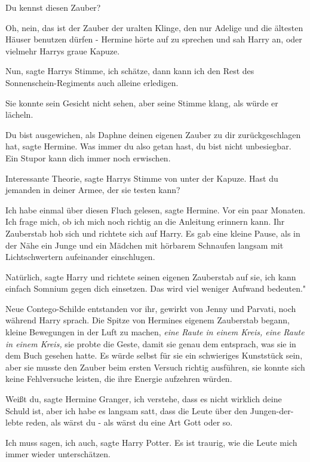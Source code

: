 \glqq{}Du kennst diesen Zauber?\grqq{}

\glqq{}Oh, nein, das ist der Zauber der uralten Klinge, den nur Adelige und die
ältesten Häuser benutzen dürfen -\grqq{} Hermine hörte auf zu sprechen und sah
Harry an, oder vielmehr Harrys graue Kapuze.

\glqq{}Nun\grqq{}, sagte Harrys Stimme, \glqq{}ich schätze, dann kann ich den Rest
des Sonnenschein-Regiments auch alleine erledigen.\grqq{}

Sie konnte sein Gesicht nicht sehen, aber seine Stimme klang, als würde er
lächeln.

\glqq{}Du bist ausgewichen, als Daphne deinen eigenen Zauber zu dir
zurückgeschlagen hat\grqq{}, sagte Hermine. \glqq{}Was immer du also getan hast,
du bist nicht unbesiegbar. Ein Stupor kann dich immer noch erwischen.\grqq{}

\glqq{}Interessante Theorie\grqq{}, sagte Harrys Stimme von unter der Kapuze.
\glqq{}Hast du jemanden in deiner Armee, der sie testen kann?\grqq{}

\glqq{}Ich habe einmal über diesen Fluch gelesen\grqq{}, sagte Hermine. \glqq{}Vor
ein paar Monaten. Ich frage mich, ob ich mich noch richtig an die Anleitung
erinnern kann.\grqq{} Ihr Zauberstab hob sich und richtete sich auf Harry. Es
gab eine kleine Pause, als in der Nähe ein Junge und ein Mädchen mit hörbarem
Schnaufen langsam mit Lichtschwertern aufeinander einschlugen.

\glqq{}Natürlich\grqq{}, sagte Harry und richtete seinen eigenen Zauberstab auf
sie, \glqq{}ich kann einfach Somnium gegen dich einsetzen. Das wird viel weniger
Aufwand bedeuten."

Neue Contego-Schilde entstanden vor ihr, gewirkt von Jenny und Parvati, noch
während Harry sprach. Die Spitze von Hermines eigenem Zauberstab begann, kleine
Bewegungen in der Luft zu machen, \emph{eine Raute in einem Kreis, eine Raute in
einem Kreis,} sie probte die Geste, damit sie genau dem entsprach, was sie in
dem Buch gesehen hatte. Es würde selbst für sie ein schwieriges Kunststück sein,
aber sie musste den Zauber beim ersten Versuch richtig ausführen, sie konnte
sich keine Fehlversuche leisten, die ihre Energie aufzehren würden.

\glqq{}Weißt du\grqq{}, sagte Hermine Granger, \glqq{}ich verstehe, dass es nicht
wirklich deine Schuld ist, aber ich habe es langsam satt, dass die Leute über
den Jungen-der-lebte reden, als wärst du - als wärst du eine Art Gott oder
so.\grqq{}

\glqq{}Ich muss sagen, ich auch\grqq{}, sagte Harry Potter. \glqq{}Es ist traurig,
wie die Leute mich immer wieder unterschätzen.\grqq{}

